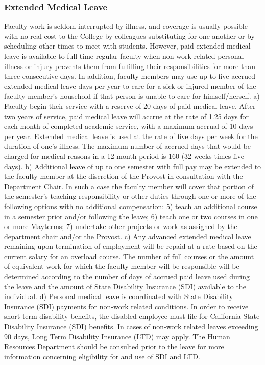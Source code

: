 \documentclass[letterpaper, 11pt]{article}
\begin{document}
		\subsubsection{Extended Medical Leave}
			Faculty work is seldom interrupted by illness, and coverage is usually possible with no real cost to the College by colleagues substituting for one another or by scheduling other times to meet with students.  However, paid extended medical leave is available to full-time regular faculty when non-work related personal illness or injury prevents them from fulfilling their responsibilities for more than three consecutive days.  In addition, faculty members may use up to five accrued extended medical leave days per year to care for a sick or injured member of the faculty member's household if that person is unable to care for himself/herself.
			a) Faculty begin their service with a reserve of 20 days of paid medical leave.  After two years of service, paid medical leave will accrue at the rate of 1.25 days for each month of completed academic service, with a maximum accrual of 10 days per year.  Extended medical leave is used at the rate of five days per week for the duration of one's illness. The maximum number of accrued days that would be charged for medical reasons in a 12 month period is 160 (32 weeks times five days).
			b) Additional leave of up to one semester with full pay may be extended to the faculty member at the discretion of the Provost in consultation with the Department Chair.  In such a case the faculty member will cover that portion of the semester's teaching responsibility or other duties through one or more of the following options with no additional compensation:
			5) teach an additional course in a semester prior and/or following the leave;
			6) teach one or two courses in one or more Mayterms;
			7) undertake other projects or work as assigned by the department chair and/or the Provost.
			c) Any advanced extended medical leave remaining upon termination of employment will be repaid at a rate based on the current salary for an overload course.
			The number of full courses or the amount of equivalent work for which the faculty member will be responsible will be determined according to the number of days of accrued paid leave used during the leave and the amount of State Disability Insurance (SDI) available to the individual.
			d) Personal medical leave is coordinated with State Disability Insurance (SDI) payments for non-work related conditions. In order to receive short-term disability benefits, the disabled employee must file for California State Disability Insurance (SDI) benefits.  In cases of non-work related leaves exceeding 90 days, Long Term Disability Insurance (LTD) may apply.  The Human Resources Department should be consulted prior to the leave for more information concerning eligibility for and use of SDI and LTD.
\end{document}
